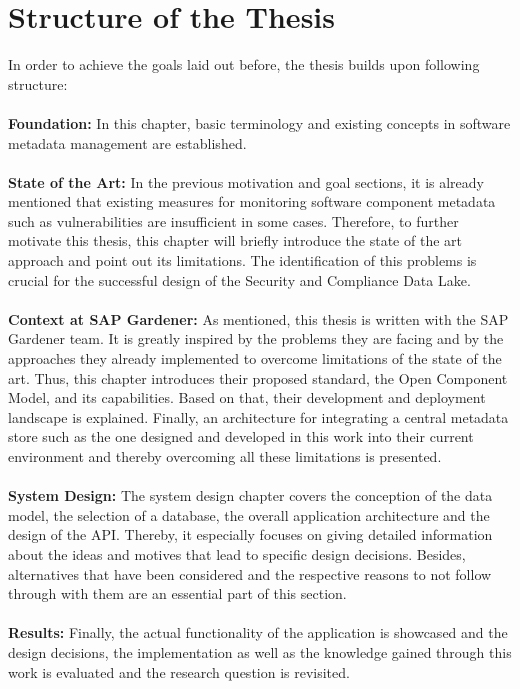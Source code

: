 \section{Structure of the Thesis}
In order to achieve the goals laid out before, the thesis builds upon following structure:\\\\
\textbf{Foundation:} In this chapter, basic terminology and existing concepts in software metadata management are established.\\\\
\textbf{State of the Art:} In the previous motivation and goal sections, it is already mentioned that existing measures for monitoring software component metadata such as vulnerabilities are insufficient in some cases. Therefore, to further motivate this thesis, this chapter will briefly introduce the state of the art approach and point out its limitations. The identification of this problems is crucial for the successful design of the Security and Compliance Data Lake.\\\\
\textbf{Context at SAP Gardener:} As mentioned, this thesis is written with the SAP Gardener team. It is greatly inspired by the problems they are facing and by the approaches they already implemented to overcome limitations of the state of the art. Thus, this chapter introduces their proposed standard, the Open Component Model, and its capabilities. Based on that, their development and deployment landscape is explained. Finally, an architecture for integrating a central metadata store such as the one designed and developed in this work into their current environment and thereby overcoming all these limitations is presented.\\\\
\textbf{System Design:} The system design chapter covers the conception of the data model, the selection of a database, the overall application architecture and the design of the API. Thereby, it especially focuses on giving detailed information about the ideas and motives that lead to specific design decisions. Besides, alternatives that have been considered and the respective reasons to not follow through with them are an essential part of this section.\\\\
\textbf{Results:} Finally, the actual functionality of the application is showcased and the design decisions, the implementation as well as the knowledge gained through this work is evaluated and the research question is revisited.


